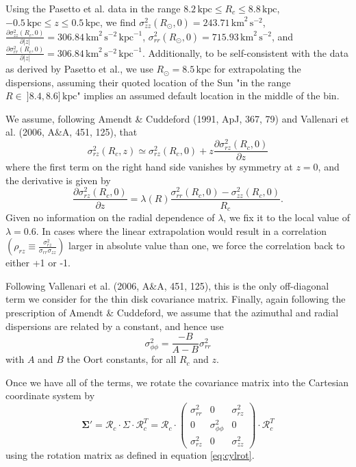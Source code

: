\documentclass[fleqn,usenatbib]{mnras}
\begin{document}
Using the Pasetto et al. data in the range $8.2\,\mathrm{kpc} \leq R_c \leq 8.8\,\mathrm{kpc}$, $-0.5\,\mathrm{kpc} \leq z \leq 0.5\,\mathrm{kpc}$, we find $\sigma_{zz}^2(R_\odot, 0) = 243.71\,\mathrm{km}^2\,\mathrm{s}^{-2}$, $\frac{\partial \sigma_{zz}^2(R_c, 0)}{\partial \lvert z \lvert} = 306.84\,\mathrm{km}^2\,\mathrm{s}^{-2}\,\mathrm{kpc}^{-1}$, $\sigma_{rr}^2(R_\odot, 0) = 715.93\,\mathrm{km}^2\,\mathrm{s}^{-2}$, and $\frac{\partial \sigma_{rr}^2(R_c, 0)}{\partial \lvert z \lvert} = 306.84\,\mathrm{km}^2\,\mathrm{s}^{-2}\,\mathrm{kpc}^{-1}$. Additionally, to be self-consistent with the data as derived by Pasetto et al., we use $R_\odot = 8.5\,\mathrm{kpc}$ for extrapolating the dispersions, assuming their quoted location of the Sun "in the range $R \in\ ]8.4, 8.6]\,\mathrm{kpc}$" implies an assumed default location in the middle of the bin.

We assume, following Amendt \& Cuddeford (1991, ApJ, 367, 79) and Vallenari et al. (2006, A\&A, 451, 125), that
\begin{equation}
    \sigma_{rz}^2(R_c, z) \simeq \sigma_{rz}^2(R_c, 0) + z \frac{\partial \sigma_{rz}^2(R_c, 0)}{\partial z}
\end{equation}
where the first term on the right hand side vanishes by symmetry at $z=0$, and the derivative is given by
\begin{equation}
    \frac{\partial \sigma_{rz}^2(R_c, 0)}{\partial z} = \lambda(R)\frac{\sigma_{rr}^2(R_c, 0) - \sigma_{zz}^2(R_c, 0)}{R_c}.
\end{equation}
Given no information on the radial dependence of $\lambda$, we fix it to the local value of $\lambda = 0.6$. In cases where the linear extrapolation would result in a correlation $\left(\rho_{rz} \equiv \frac{\sigma_{rz}^2}{\sigma_{rr}\sigma_{zz}}\right)$ larger in absolute value than one, we force the correlation back to either +1 or -1.

Following Vallenari et al. (2006, A\&A, 451, 125), this is the only off-diagonal term we consider for the thin disk covariance matrix. Finally, again following the prescription of Amendt \& Cuddeford, we assume that the azimuthal and radial dispersions are related by a constant, and hence use
\begin{equation}
    \sigma_{\phi\phi}^2 = \frac{-B}{A - B} \sigma_{rr}^2    
\end{equation}
with $A$ and $B$ the Oort constants, for all $R_c$ and $z$.

Once we have all of the terms, we rotate the covariance matrix into the Cartesian coordinate system by
\begin{equation}
    \bm{\Sigma}{'} = \bm{\mathcal{R}}_c \cdot \Sigma \cdot \bm{\mathcal{R}}_c^T = \bm{\mathcal{R}}_c \cdot \left(\begin{matrix} \sigma_{rr}^2 & 0 & \sigma_{rz}^2 \\ 0 & \sigma_{\phi\phi}^2 & 0 \\ \sigma_{rz}^2 & 0 & \sigma_{zz}^2 \end{matrix}\right) \cdot \bm{\mathcal{R}}_c^T
\end{equation}
using the rotation matrix as defined in equation \ref{eq:cylrot}.
\end{document}
